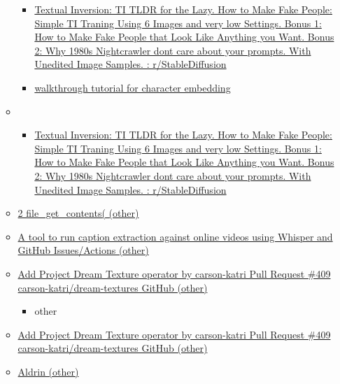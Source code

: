 \begin{itemize}
\begin{itemize}
\begin{itemize}
    \item
      \href{https://www.reddit.com/r/StableDiffusion/comments/11ocwgw/textual_inversion_ti_tldr_for_the_lazy_how_to/}{Textual
      Inversion: TI TLDR for the Lazy. How to Make Fake People: Simple
      TI Traning Using 6 Images and very low Settings. Bonus 1: How to
      Make Fake People that Look Like Anything you Want. Bonus 2: Why
      1980s Nightcrawler dont care about your prompts. With Unedited
      Image Samples. : r/StableDiffusion}
    \end{itemize}

    \begin{itemize}
     
    \item
      \href{https://github.com/BelieveDiffusion/tutorials/tree/main/consistent_character_embedding\#readme}{walkthrough
      tutorial for character embedding}
    \end{itemize}
  \item
    \begin{itemize}
     
    \item
      \href{https://www.reddit.com/r/StableDiffusion/comments/11ocwgw/textual_inversion_ti_tldr_for_the_lazy_how_to/}{Textual
      Inversion: TI TLDR for the Lazy. How to Make Fake People: Simple
      TI Traning Using 6 Images and very low Settings. Bonus 1: How to
      Make Fake People that Look Like Anything you Want. Bonus 2: Why
      1980s Nightcrawler dont care about your prompts. With Unedited
      Image Samples. : r/StableDiffusion}
    \end{itemize}
  \item
    \href{https://crsreports.congress.gov/product/pdf/r/r47224}{2
    file\_get\_contents( (other)}
  \item
    \href{https://simonwillison.net/2022/Sep/30/action-transcription/}{A
    tool to run caption extraction against online videos using Whisper
    and GitHub Issues/Actions (other)}
  \item
    \href{https://github.com/carson-katri/dream-textures/pull/409}{Add
    Project Dream Texture operator by carson-katri   Pull Request \#409
      carson-katri/dream-textures   GitHub (other)}

    \begin{itemize}
     
    \item
      other
    \end{itemize}
  \item
    \href{https://github.com/carson-katri/dream-textures/pull/409}{Add
    Project Dream Texture operator by carson-katri   Pull Request \#409
      carson-katri/dream-textures   GitHub (other)}
  \item
    \href{https://dex.aldrin.com/chart/spot/liq_usdc}{Aldrin (other)}


\end{itemize}
\end{itemize}
